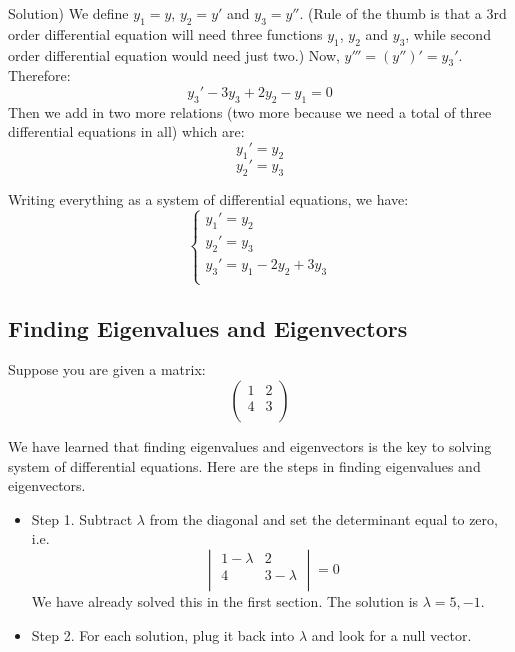 \documentclass[12pt]{report}
\begin{document}
Solution) We define $y_1 = y$, $y_2 = y'$ and $y_3 = y''$. (Rule of the thumb is that a 3rd order differential equation will need three functions $y_1$, $y_2$ and $y_3$, while second order differential equation would need just two.)
Now, $y'''=(y'')'=y_3'$. Therefore:
$$y_3' - 3y_3 + 2y_2 - y_1 =0$$
Then we add in two more relations (two more because we need a total of three differential equations in all) which are:
$$y_1' = y_2$$
$$y_2' = y_3$$

Writing everything as a system of differential equations, we have:
$$\begin{cases} y_1' = y_2 \\ y_2' = y_3 \\ y_3'=y_1 - 2y_2+ 3y_3 \\  \end{cases}$$

\subsection*{Finding Eigenvalues and Eigenvectors }

Suppose you are given a matrix:
$$\begin{pmatrix} 1 & 2 \\ 4 & 3 \\ \end{pmatrix}$$

We have learned that finding eigenvalues and eigenvectors is the key to solving system of differential equations. Here are the steps in finding eigenvalues and eigenvectors.

\begin{itemize}
\item  Step 1. Subtract $\lambda$ from the diagonal and set the determinant equal to zero, i.e.
$$\begin{vmatrix} 1-\lambda & 2 \\ 4 & 3-\lambda \\ \end{vmatrix} = 0$$
We have already solved this in the first section. The solution is $\lambda= 5, -1$.
\item  Step 2. For each solution, plug it back into $\lambda$ and look for a null vector.
\end{itemize}
\end{document}
